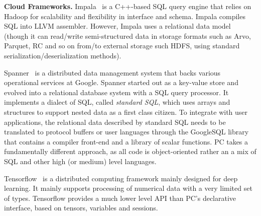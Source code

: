 \vspace{5pt} 
\noindent
\textbf{Cloud Frameworks.} Impala~\cite{bittorf2015impala} is a
C++-based 
SQL query engine that relies on Hadoop for scalability and 
flexibility in interface and schema. Impala compiles SQL 
into LLVM assembler.
However,
Impala uses a relational data model (though it can read/write
semi-structured data in storage formats such as Arvo, Parquet, RC and so
on from/to external storage such HDFS, using standard
serialization/deserialization methods).

Spanner~\cite{bacon2017spanner} is a
distributed data management system that backs various operational services
at Google. Spanner started out as a key-value store and evolved into a
relational database system with a SQL query processor. It implements a
dialect of SQL, called \emph{standard SQL}, which uses arrays and structures to
support nested data as a first class citizen. To integrate
with user applications, the relational data described by standard SQL needs to
be translated to protocol buffers or user languages through the
GoogleSQL library that contains a compiler front-end and a library of
scalar functions. PC takes a fundamentally different approach, as all code is 
object-oriented rather an a mix of SQL and other high (or medium) level languages.

Tensorflow~\cite{abadi2016tensorflow} is a
distributed computing framework mainly designed for deep learning. It
mainly supports processing of numerical data with a
very limited set of types.
Tensorflow provides
a much lower level API than PC's declarative interface, based on tensors,
variables and sessions.


